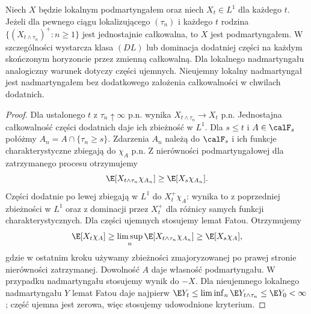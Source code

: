 \begin{twierdzenie}
\label{thm:local-submart-criteria}
Niech $X$ będzie lokalnym podmartyngałem
oraz niech $X_t\in L^1$ dla każdego $t$.
Jeżeli dla pewnego ciągu lokalizującego
$(\tau_n)$ i każdego $t$ rodzina
$\{(X_{t\wedge\tau_n})^+:n\ge1\}$
jest jednostajnie całkowalna, to $X$ jest
podmartyngałem. W szczególności wystarcza
klasa $(DL)$ lub dominacja dodatniej części
na każdym skończonym horyzoncie przez zmienną
całkowalną.
Dla lokalnego nadmartyngału analogiczny
warunek dotyczy części ujemnych.
Nieujemny lokalny nadmartyngał jest
nadmartyngałem bez dodatkowego założenia
całkowalności w chwilach dodatnich.
\end{twierdzenie}
\begin{proof}
Dla ustalonego $t$ z $\tau_n\uparrow\infty$ p.n.
wynika $X_{t\wedge\tau_n}\to X_t$ p.n.
Jednostajna całkowalność części dodatnich
daje ich zbieżność w $L^1$.
Dla $s\le t$ i $A\in\calF_s$ połóżmy
$A_n=A\cap\{\tau_n\ge s\}$.
Zdarzenia $A_n$ należą do $\calF_s$
i ich funkcje charakterystyczne zbiegają
do $\chi_A$ p.n. Z nierówności
podmartyngałowej dla zatrzymanego procesu
otrzymujemy
\[
\E[X_{t\wedge\tau_n}\chi_{A_n}]
\ge \E[X_s\chi_{A_n}].
\]
Części dodatnie po lewej zbiegają w $L^1$ do
$X_t^+\chi_A$: wynika to z poprzedniej
zbieżności w $L^1$ oraz z dominacji przez
$X_t^+$ dla różnicy samych funkcji
charakterystycznych. Dla części ujemnych
stosujemy lemat Fatou. Otrzymujemy
\[
\E[X_t\chi_A]\ge
\limsup_n\E[X_{t\wedge\tau_n}\chi_{A_n}]
\ge \E[X_s\chi_A],
\]
gdzie w ostatnim kroku używamy zbieżności
zmajoryzowanej po prawej stronie nierówności
zatrzymanej. Dowolność $A$ daje własność
podmartyngału. W przypadku nadmartyngału
stosujemy wynik do $-X$.
Dla nieujemnego lokalnego nadmartyngału
$Y$ lemat Fatou daje najpierw
$\E Y_t\le\liminf_n\E Y_{t\wedge\tau_n}
\le\E Y_0<\infty$; część ujemna jest zerowa,
więc stosujemy udowodnione kryterium.
\end{proof}

